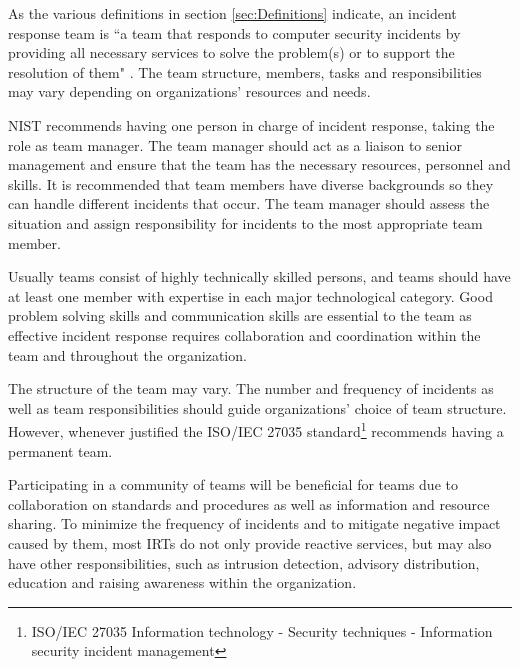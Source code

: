 As the various definitions in section \ref{sec:Definitions} indicate, an incident response team is ``a team that responds to computer security incidents by providing all necessary services to solve the problem(s) or to support the resolution of them" \cite{enisaCSIRTGoodPractices}. The team structure, members, tasks and responsibilities may vary depending on organizations' resources and needs. 

\ac{NIST} recommends having one person in charge of incident response, taking the role as team manager. The team manager should act as a liaison to senior management and ensure that the team has the necessary resources, personnel and skills. It is recommended that team members have diverse backgrounds so they can handle different incidents that occur. The team manager should assess the situation and assign responsibility for incidents to the most appropriate team member. \cite{nist800-61}

Usually teams consist of highly technically skilled persons, and teams should have at least one member with expertise in each major technological category. Good problem solving skills and communication skills are essential to the team as effective incident response requires collaboration and coordination within the team and throughout the organization. \cite{nist800-61}

The structure of the team may vary. The number and frequency of incidents as well as team responsibilities should guide organizations' choice of team structure. However, whenever justified  the ISO/IEC 27035 standard\footnote{ISO/IEC 27035 Information technology - Security techniques - Information security incident management} recommends having a permanent team. \cite{ISO/IEC27035}

%

Participating in a community of teams will be beneficial for teams due to collaboration on standards and procedures as well as information and resource sharing. To minimize the frequency of incidents and to mitigate negative impact caused by them, most \acp{IRT} do not only provide reactive services, but may also have other responsibilities, such as intrusion detection, advisory distribution, education and raising awareness within the organization. \cite{nist800-61}  
  
